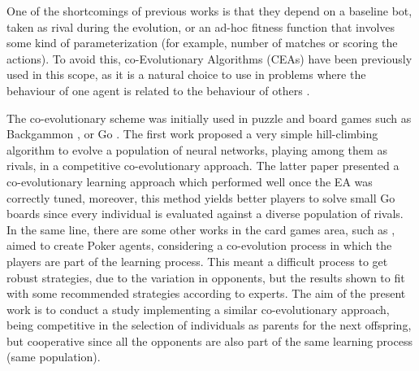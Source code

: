 \documentclass[conference]{IEEEtran}
\begin{document}
One of the shortcomings of previous works is that they depend on a baseline bot, taken as rival during the evolution, or an ad-hoc fitness function that involves some kind of parameterization (for example, number of matches or scoring the actions). To avoid this, co-Evolutionary Algorithms (CEAs)
have been previously used in this scope, as it is a natural choice to use in problems where the behaviour of one agent is related to the behaviour of others \cite{Coevolving13Samothrakis}.

The co-evolutionary scheme was initially used in puzzle and board games such as Backgammon \cite{Pollack_Backgammon98}, or Go \cite{Runarsson_Go2005}.
The first work proposed a very simple hill-climbing algorithm to evolve a population of neural networks, playing among them as rivals, in a competitive co-evolutionary approach. The latter paper presented a co-evolutionary learning approach which performed well once the EA was correctly tuned, moreover, this method yields better players to solve small Go boards since every individual is evaluated against a diverse population of rivals.
In the same line, there are some other works in the card games area, such as \cite{Thompson_Poker2008}, aimed to create Poker agents, considering a co-evolution process in which the players are part of the learning process. This meant a difficult process to get robust strategies, due to the variation in opponents, but the results shown to fit with some recommended strategies according to experts.
The aim of the present work is to conduct a study implementing a similar co-evolutionary approach, being competitive in the selection of individuals as parents for the next offspring,
but cooperative since all the opponents are also part of the same learning process (same population).
\end{document}

